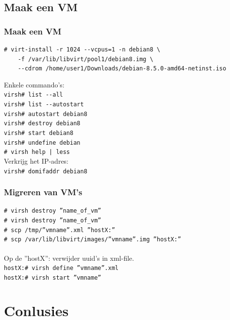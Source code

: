 \subsection {Maak een VM}
\begin{styleframefrag}
    \frametitle{Maak een VM}
\scriptsize
\begin{verbatim}
# virt-install -r 1024 --vcpus=1 -n debian8 \
    -f /var/lib/libvirt/pool1/debian8.img \
    --cdrom /home/user1/Downloads/debian-8.5.0-amd64-netinst.iso
\end{verbatim}
Enkele commando's:\\
\verb!virsh# list --all!\\
\pause
\verb!virsh# list --autostart!\\
\pause
\verb!virsh# autostart debian8!\\
\pause
\verb!virsh# destroy debian8!\\
\pause
\verb!virsh# start debian8!\\
\pause
\verb!virsh# undefine debian!\\
\pause
\verb!# virsh help | less!\\
Verkrijg het IP-adres:\\
\verb!virsh# domifaddr debian8!
\end{styleframefrag}

\begin{styleframefrag}
    \frametitle{Migreren van VM's}
\scriptsize
\pause
{\tt \# virsh destroy ''name\_of\_vm''}\\
\pause
{\tt \# virsh destroy ''name\_of\_vm''}\\
\pause
{\tt \# scp /tmp/''vmname''.xml ''hostX:''}\\
\pause
{\tt \# scp /var/lib/libvirt/images/''vmname''.img ''hostX:''}\\
\pause
~\\
Op de ''hostX'': verwijder uuid's in xml-file.\\
\pause
{\tt hostX:\# virsh define ''vmname''.xml}\\
\pause
{\tt hostX:\# virsh start ''vmname''}\\
\pause
\end{styleframefrag}

\section{Conlusies}

